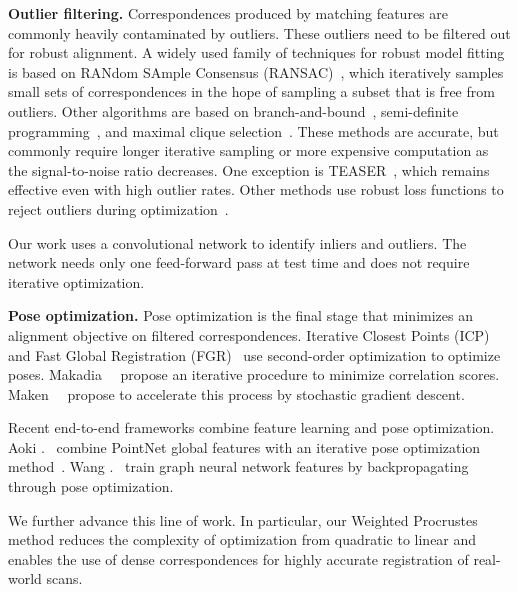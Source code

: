 \documentclass[10pt,twocolumn,letterpaper]{article}
\begin{document}
\noindent \textbf{Outlier filtering.}
Correspondences produced by matching features are commonly heavily contaminated by outliers.
These outliers need to be filtered out for robust alignment.
A widely used family of techniques for robust model fitting is based on RANdom SAmple Consensus (RANSAC)~\cite{schnabel2007efficient,aiger20084pts, rusu2009icra, mellado2014super, holz2015registration}, which iteratively samples small sets of correspondences in the hope of sampling a subset that is free from outliers.
Other algorithms are based on branch-and-bound~\cite{yang2015go}, semi-definite programming~\cite{maron2016point,maciel2003global}, and maximal clique selection~\cite{yang2019polynomial}.
These methods are accurate, but commonly require longer iterative sampling or more expensive computation as the signal-to-noise ratio decreases. One exception is TEASER~\cite{yang2019polynomial}, which remains effective even with high outlier rates.
Other methods use robust loss functions to reject outliers during optimization~\cite{zhou2016eccv, bouaziz2013sparse}.

Our work uses a convolutional network to identify inliers and outliers. The network needs only one feed-forward pass at test time and does not require iterative optimization.






\noindent \textbf{Pose optimization.}
Pose optimization is the final stage that minimizes an alignment objective on filtered correspondences.
Iterative Closest Points (ICP)~\cite{besl1992pami} and Fast Global Registration (FGR)~\cite{zhou2016eccv} use second-order optimization to optimize poses. Makadia~\etal~\cite{makadia2006fully} propose an iterative procedure to minimize correlation scores.
Maken~\etal~\cite{maken2019speeding} propose to accelerate this process by stochastic gradient descent.

Recent end-to-end frameworks combine feature learning and pose optimization. Aoki \etal.~\cite{aoki2019pointnetlk} combine PointNet global features with an iterative pose optimization method~\cite{lucas1981iterative}. Wang \etal.~\cite{wang2019deep, wang2019nips} train graph neural network features by backpropagating through pose optimization. 

We further advance this line of work. In particular, our Weighted Procrustes method reduces the complexity of optimization from quadratic to linear and enables the use of dense correspondences for highly accurate registration of real-world scans.
\end{document}

